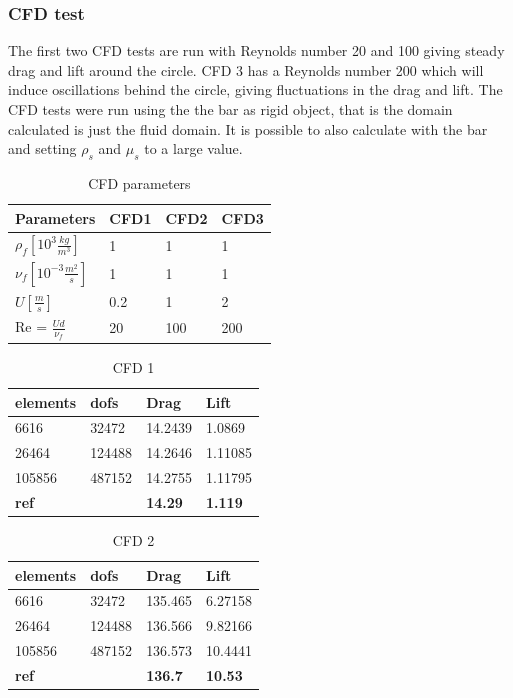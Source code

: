 \subsubsection*{CFD test}
The first two CFD tests are run with Reynolds number 20 and 100 giving steady drag and lift around the circle. CFD 3 has a Reynolds number 200 which will induce oscillations behind the circle, giving fluctuations in the drag and lift.
The CFD tests were run using the the bar as rigid object, that is the domain calculated is just the fluid domain. It is possible to also calculate with the bar and setting $\rho_s$ and $\mu_s$ to a large value. 

\begin{table}[h!]
\centering
\caption{CFD parameters}
\label{my-label}
\begin{tabular}{|l|l|l|l|}
\hline
Parameters & CFD1 & CFD2 & CFD3 \\ \hline
$\rho_f [10^3 \frac{kg}{m^3}]$ & 1 & 1 & 1 \\ \hline
$\nu_f [10^{-3} \frac{m^2}{s}]$ & 1 & 1 & 1 \\ \hline
$ U [\frac{m}{s}] $ & 0.2 & 1 & 2 \\ \hline
Re = $\frac{Ud}{\nu_f}$ & 20 & 100 & 200 \\ \hline
\end{tabular}
\end{table}

\begin{table}[h!]
\centering
\caption{CFD 1}
\label{my-label}
\begin{tabular}{|l|l|l|l|}
\hline
\textbf{elements} & \textbf{dofs} & \textbf{Drag} & \textbf{Lift} \\ \hline
6616 & 32472 & 14.2439 & 1.0869 \\ \hline
26464 & 124488 & 14.2646 & 1.11085 \\ \hline
105856 & 487152 & 14.2755 & 1.11795 \\ \hline
\textbf{ref} & \textbf{} & \textbf{14.29} & \textbf{1.119} \\ \hline
\end{tabular}
\end{table}

\begin{table}[h!]
\centering
\caption{CFD 2}
\label{my-label}
\begin{tabular}{|l|l|l|l|}
\hline
\textbf{elements} & \textbf{dofs} & \textbf{Drag} & \textbf{Lift} \\ \hline
6616 & 32472 & 135.465 & 6.27158 \\ \hline
26464 & 124488 & 136.566 & 9.82166 \\ \hline
105856 & 487152 & 136.573 & 10.4441 \\ \hline
\textbf{ref} & \textbf{} & \textbf{136.7} & \textbf{10.53} \\ \hline
\end{tabular}
\end{table}

